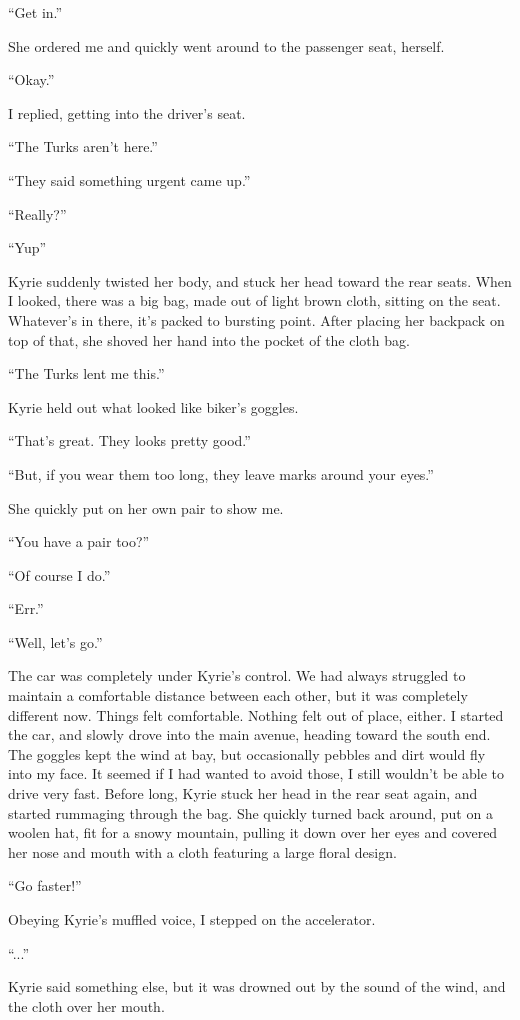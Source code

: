 \documentclass[oneside]{book}
\begin{document}
“Get in.”

She ordered me and quickly went around to the passenger seat, herself.

“Okay.”

I replied, getting into the driver’s seat.

“The Turks aren’t here.”

“They said something urgent came up.”

“Really?”

“Yup”

Kyrie suddenly twisted her body, and stuck her head toward the rear seats. When I looked, there was a big bag, made out of light brown cloth, sitting on the seat. Whatever’s in there, it’s packed to bursting point. After placing her backpack on top of that, she shoved her hand into the pocket of the cloth bag.

“The Turks lent me this.”

Kyrie held out what looked like biker’s goggles.

“That’s great. They looks pretty good.”

“But, if you wear them too long, they leave marks around your eyes.”

She quickly put on her own pair to show me.

“You have a pair too?”

“Of course I do.”

“Err.”

“Well, let’s go.”

The car was completely under Kyrie’s control. We had always struggled to maintain a comfortable distance between each other, but it was completely different now. Things felt comfortable. Nothing felt out of place, either. I started the car, and slowly drove into the main avenue, heading toward the south end. The goggles kept the wind at bay, but occasionally pebbles and dirt would fly into my face. It seemed if I had wanted to avoid those, I still wouldn’t be able to drive very fast. Before long, Kyrie stuck her head in the rear seat again, and started rummaging through the bag. She quickly turned back around, put on a woolen hat, fit for a snowy mountain, pulling it down over her eyes and covered her nose and mouth with a cloth featuring a large floral design.

“Go faster!”

Obeying Kyrie’s muffled voice, I stepped on the accelerator.

“...”

Kyrie said something else, but it was drowned out by the sound of the wind, and the cloth over her mouth.
\end{document}
